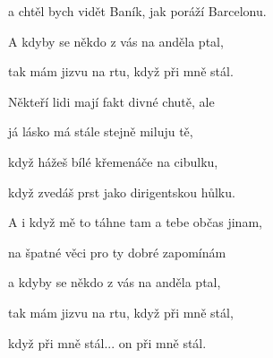 a chtěl bych vidět Baník, jak poráží Barcelonu.

A kdyby se někdo z vás na anděla ptal,

tak mám jizvu na rtu, když při mně stál.
\ks

\zs
Někteří lidi mají fakt divné chutě, ale

já lásko má stále stejně miluju tě,

když hážeš bílé křemenáče na cibulku,

když zvedáš prst jako dirigentskou hůlku.

A i když mě to táhne tam a tebe občas jinam,

na špatné věci pro ty dobré zapomínám

a kdyby se někdo z vás na anděla ptal,

tak mám jizvu na rtu, když při mně stál,

když při mně stál... on při mně stál.
\ks

\kp
